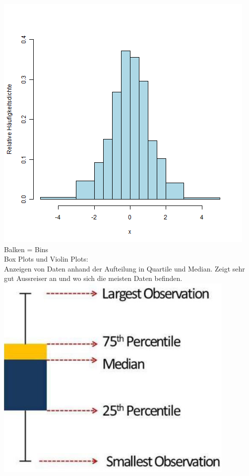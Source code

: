 \includegraphics[width=\linewidth]{img/histogram.png}
Balken = Bins\\
\textcolor{myblue}{Box Plots und Violin Plots:}\\
Anzeigen von Daten anhand der Aufteilung in Quartile und Median. Zeigt sehr gut Aussreiser an und wo sich die meisten Daten befinden.
\includegraphics[width=0.9\linewidth]{img/boxplot.png}
